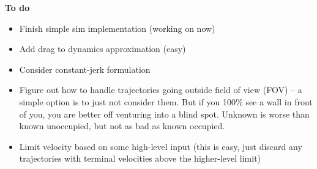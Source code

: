 \documentclass[paper=a4, fontsize=11pt]{scrartcl} %
\numberwithin{equation}{section} %
\numberwithin{figure}{section} %
\numberwithin{table}{section} %
\begin{document}
\textbf{To do}
\\
\begin{itemize}
\item Finish simple sim implementation (working on now)
\item Add drag to dynamics approximation (easy)
\item Consider constant-jerk formulation
\item Figure out how to handle trajectories going outside field of view (FOV) -- a simple option is to just not consider them.  But if you 100\% see a wall in front of you, you are better off venturing into a blind spot.  Unknown is worse than known unoccupied, but not as bad as known occupied.
\item Limit velocity based on some high-level input (this is easy, just discard any trajectories with terminal velocities above the higher-level limit)
\end{itemize}










\end{document}
